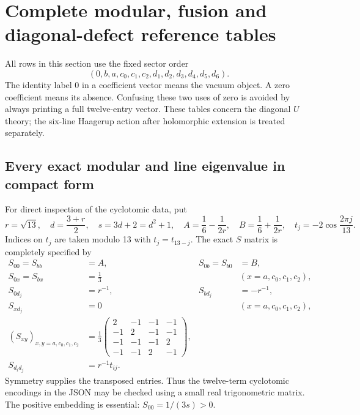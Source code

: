 \clearpage
\section{Complete modular, fusion and diagonal-defect reference tables}
\label{expphysics:defect-details}

All rows in this section use the fixed sector order
\begin{equation}
 (0,b,a,c_0,c_1,c_2,d_1,d_2,d_3,d_4,d_5,d_6).
 \label{expphysics:center-order}
\end{equation}
The identity label $0$ in a coefficient vector means the vacuum
object. A zero coefficient means its absence. Confusing these
two uses of zero is avoided by always printing a full twelve-entry
vector. These tables concern the diagonal $U$ theory; the six-line
Haagerup action after holomorphic extension is treated separately.

\subsection{Every exact modular and line eigenvalue in compact form}

For direct inspection of the cyclotomic data, put
\[
 r=\sqrt{13},\quad d=\frac{3+r}{2},\quad s=3d+2=d^2+1,
 \quad A=\frac16-\frac1{2r},\quad B=\frac16+\frac1{2r},
 \quad t_j=-2\cos\frac{2\pi j}{13}.
\]
Indices on $t_j$ are taken modulo 13 with $t_j=t_{13-j}$.
The exact $S$ matrix is completely specified by
\begin{align}
 S_{00}=S_{bb}&=A,&S_{0b}=S_{b0}&=B,\\
 S_{0x}=S_{bx}&=\frac13&& (x=a,c_0,c_1,c_2),\\
 S_{0d_j}&=r^{-1},&S_{bd_j}&=-r^{-1},\\
 S_{xd_j}&=0&& (x=a,c_0,c_1,c_2),\\
 (S_{xy})_{x,y=a,c_0,c_1,c_2}
 &=\frac13\begin{pmatrix}2&-1&-1&-1\\-1&2&-1&-1\\-1&-1&-1&2\\-1&-1&2&-1\end{pmatrix},&&\\
 S_{d_id_j}&=r^{-1}t_{ij}.&&
 \label{expphysics:exact-S}
\end{align}
Symmetry supplies the transposed entries. Thus the twelve-term
cyclotomic encodings in the JSON may be checked using a small
real trigonometric matrix. The positive embedding is essential:
$S_{00}=1/(3s)>0$.

